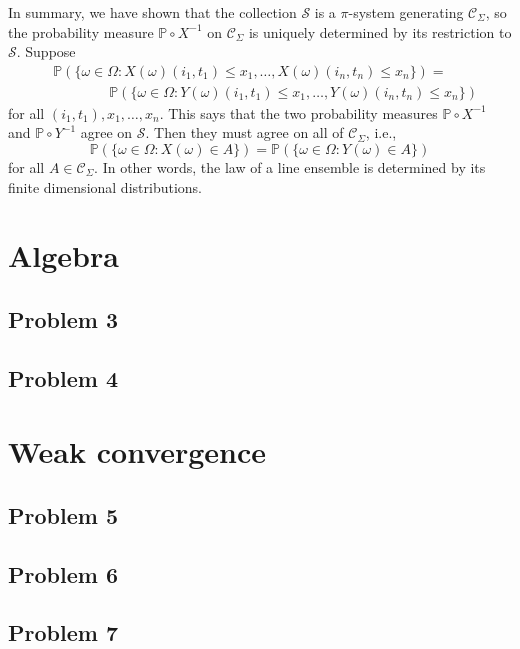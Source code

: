 \documentclass[12pt]{article}
\begin{document}
		In summary, we have shown that the collection $\mathcal{S}$ is a $\pi$-system generating $\mathcal{C}_\Sigma$, so the probability measure $\mathbb{P}\circ X^{-1}$ on $\mathcal{C}_\Sigma$ is uniquely determined by its restriction to $\mathcal{S}$. Suppose
		\begin{align*}
		&\mathbb{P}\left(\{\omega\in\Omega : X(\omega)(i_1,t_1)\leq x_1,\dots,X(\omega)(i_n,t_n)\leq x_n\}\right) =\\
		&\qquad\qquad \mathbb{P}\left(\{\omega\in\Omega : Y(\omega)(i_1,t_1)\leq x_1,\dots,Y(\omega)(i_n,t_n)\leq x_n\}\right)
		\end{align*}
		for all $(i_1,t_1), x_1,\dots,x_n$. This says that the two probability measures $\mathbb{P}\circ X^{-1}$ and $\mathbb{P}\circ Y^{-1}$ agree on $\mathcal{S}$. Then they must agree on all of $\mathcal{C}_\Sigma$, i.e.,
		\[
		\mathbb{P}\left(\{\omega\in\Omega : X(\omega)\in A\}\right) = \mathbb{P}\left(\{\omega\in\Omega : Y(\omega)\in A\}\right)
		\]
		for all $A\in\mathcal{C}_\Sigma$. In other words, the law of a line ensemble is determined by its finite dimensional distributions.
		

\section{Algebra}

	\subsection*{Problem 3}
	
	\subsection*{Problem 4}


\section{Weak convergence}

	\subsection*{Problem 5}
	
	\subsection*{Problem 6}
	
	\subsection*{Problem 7}
\end{document}
